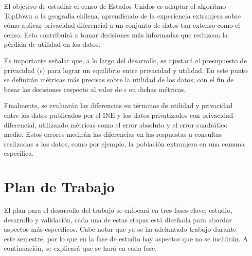 \documentclass[informe]{upropuesta}
\begin{document}
El objetivo de estudiar el censo de Estados Unidos es adaptar el algoritmo TopDown a la geografía chilena, aprendiendo de la experiencia extranjera sobre cómo aplicar privacidad diferencial a un conjunto de datos tan extenso como el censo. Esto contribuirá a tomar decisiones más informadas que reduzcan la pérdida de utilidad en los datos.

Es importante señalar que, a lo largo del desarrollo, se ajustará el presupuesto de privacidad ($\epsilon$) para lograr un equilibrio entre privacidad y utilidad. En este punto se definirán métricas más precisas sobre la utilidad de los datos, con el fin de basar las decisiones respecto al valor de $\epsilon$ en dichas métricas.

Finalmente, se evaluarán las diferencias en términos de utilidad y privacidad entre los datos publicados por el INE y los datos privatizados con privacidad diferencial, utilizando métricas como el error absoluto y el error cuadrático medio. Estos errores medirán las diferencias en las respuestas a consultas realizadas a los datos, como por ejemplo, la población extranjera en una comuna específica.

\section{Plan de Trabajo}\label{sec:pdt}

El plan para el desarrollo del trabajo se enfocará en tres fases clave: estudio, desarrollo y validación, cada una de estas etapas está diseñada para abordar aspectos más específicos. Cabe notar que ya se ha adelantado trabajo durante este semestre, por lo que en la fase de estudio hay aspectos que no se incluirán. A continuación, se explicará que se hará en cada fase.
\end{document}
